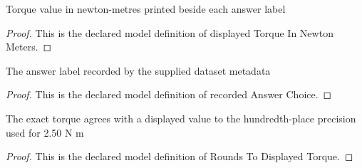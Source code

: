 \begin{definition}
  \label{def:physics:phyx-mini-0777:phyxminiproblems-problemphyxmini0777-displayedtorqueinnewtonmeters}
  Torque value in newton-metres printed beside each answer label
\end{definition}
\begin{proof}
  This is the declared model definition of displayed Torque In Newton Meters.
\end{proof}
\begin{definition}
  \label{def:physics:phyx-mini-0777:phyxminiproblems-problemphyxmini0777-recordedanswerchoice}
  The answer label recorded by the supplied dataset metadata
\end{definition}
\begin{proof}
  This is the declared model definition of recorded Answer Choice.
\end{proof}
\begin{definition}
  \label{def:physics:phyx-mini-0777:phyxminiproblems-problemphyxmini0777-roundstodisplayedtorque}
  The exact torque agrees with a displayed value to the hundredth-place precision used for 2.50 N m
\end{definition}
\begin{proof}
  This is the declared model definition of Rounds To Displayed Torque.
\end{proof}
